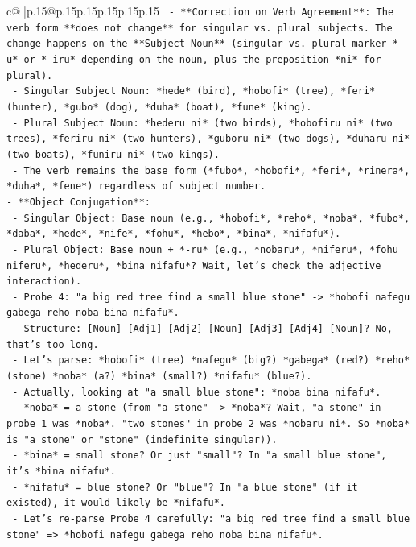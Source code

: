 \documentclass{article}
\begin{document}
{\begin{supertabular}{c@{$\;$}|p{.15\linewidth}@{}p{.15\linewidth}p{.15\linewidth}p{.15\linewidth}p{.15\linewidth}p{.15\linewidth}}
{{{\texttt{  {-} **Correction on Verb Agreement**: The verb form **does not change** for singular vs. plural subjects. The change happens on the **Subject Noun** (singular vs. plural marker *{-}u* or *{-}iru* depending on the noun, plus the preposition *ni* for plural).} \\
\texttt{    {-} Singular Subject Noun: *hede* (bird), *hobofi* (tree), *feri* (hunter), *gubo* (dog), *duha* (boat), *fune* (king).} \\
\texttt{    {-} Plural Subject Noun: *hederu ni* (two birds), *hobofiru ni* (two trees), *feriru ni* (two hunters), *guboru ni* (two dogs), *duharu ni* (two boats), *funiru ni* (two kings).} \\
\texttt{    {-} The verb remains the base form (*fubo*, *hobofi*, *feri*, *rinera*, *duha*, *fene*) regardless of subject number.} \\
\texttt{{-} **Object Conjugation**: } \\
\texttt{  {-} Singular Object: Base noun (e.g., *hobofi*, *reho*, *noba*, *fubo*, *daba*, *hede*, *nife*, *fohu*, *hebo*, *bina*, *nifafu*).} \\
\texttt{  {-} Plural Object: Base noun + *{-}ru* (e.g., *nobaru*, *niferu*, *fohu niferu*, *hederu*, *bina nifafu*? Wait, let's check the adjective interaction).} \\
\texttt{  {-} Probe 4: "a big red tree find a small blue stone" {-}> *hobofi nafegu gabega reho noba bina nifafu*.} \\
\texttt{    {-} Structure: {[}Noun{]} {[}Adj1{]} {[}Adj2{]} {[}Noun{]} {[}Adj3{]} {[}Adj4{]} {[}Noun{]}? No, that's too long.} \\
\texttt{    {-} Let's parse: *hobofi* (tree) *nafegu* (big?) *gabega* (red?) *reho* (stone) *noba* (a?) *bina* (small?) *nifafu* (blue?).} \\
\texttt{    {-} Actually, looking at "a small blue stone": *noba bina nifafu*.} \\
\texttt{      {-} *noba* = a stone (from "a stone" {-}> *noba*? Wait, "a stone" in probe 1 was *noba*. "two stones" in probe 2 was *nobaru ni*. So *noba* is "a stone" or "stone" (indefinite singular)).} \\
\texttt{      {-} *bina* = small stone? Or just "small"? In "a small blue stone", it's *bina nifafu*.} \\
\texttt{      {-} *nifafu* = blue stone? Or "blue"? In "a blue stone" (if it existed), it would likely be *nifafu*.} \\
\texttt{    {-} Let's re{-}parse Probe 4 carefully: "a big red tree find a small blue stone" => *hobofi nafegu gabega reho noba bina nifafu*.} \\
}}}
\end{supertabular}}
\end{document}
